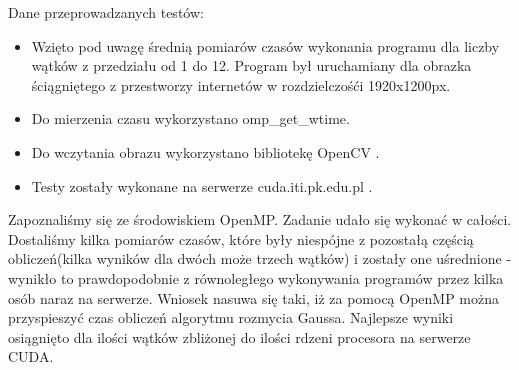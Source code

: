 \documentclass[a4paper,12pt]{article}
\newenvironment{lista}{
\begin{itemize}
  \setlength{\itemsep}{1pt}
  \setlength{\parskip}{0pt}
  \setlength{\parsep}{0pt}
}{\end{itemize}}
\begin{document}
Dane przeprowadzanych testów:
\begin{lista}
 \item Wzięto pod uwagę średnią pomiarów czasów wykonania programu dla liczby wątków z przedziału od 1 do 12. Program był uruchamiany dla obrazka ściągniętego z przestworzy internetów w rozdzielczośći 1920x1200px.
 \item Do mierzenia czasu wykorzystano omp\_get\_wtime.
 \item Do wczytania obrazu wykorzystano bibliotekę OpenCV .
 \item Testy zostały wykonane na serwerze cuda.iti.pk.edu.pl . 
\end{lista}
 
Zapoznaliśmy się ze środowiskiem OpenMP. Zadanie udało się wykonać w całości. Dostaliśmy kilka pomiarów czasów, które były niespójne z pozostałą częścią obliczeń(kilka wyników dla dwóch może trzech wątków) i zostały one uśrednione - wynikło to prawdopodobnie z równoległego wykonywania programów przez kilka osób naraz na serwerze. Wniosek nasuwa się taki, iż za pomocą OpenMP można przyspieszyć czas obliczeń algorytmu rozmycia Gaussa. Najlepsze wyniki osiągnięto dla ilości wątków zbliżonej do ilości rdzeni procesora na serwerze CUDA. 
\end{document}
